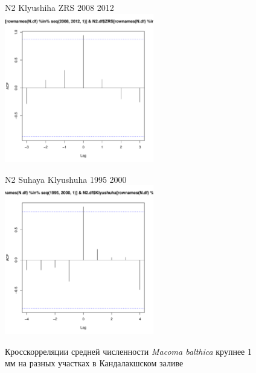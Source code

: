 \documentclass[12pt, a4paper]{disser}
\begin{document}
\begin{figure}[ht]
	\begin{minipage}[b]{.46\linewidth}
	\begin{center}
	{\tiny   N2 Klyushiha ZRS 2008 2012}
	\includegraphics[width=65mm]{../White_Sea/dynamic_N_N1/crosscorr_N2_Klyushiha_ZRS_2008_2012.pdf}
	\end{center}
	\end{minipage}
%
	\hfil %
%
	\begin{minipage}[b]{.46\linewidth}
	\begin{center}
	{\tiny   N2 Suhaya Klyushuha 1995 2000}
	\includegraphics[width=65mm]{../White_Sea/dynamic_N_N1/crosscorr_N2_Suhaya_Klyushuha_1995_2000.pdf}
	\end{center}
	\end{minipage}

	\caption{Кросскорреляции средней численности {\it Macoma balthica} крупнее 1 мм на разных участках в Кандалакшском заливе}
	\label{ris:сcrosscorr_N2_Kandalaksha}
	\end{figure}
\end{document}
